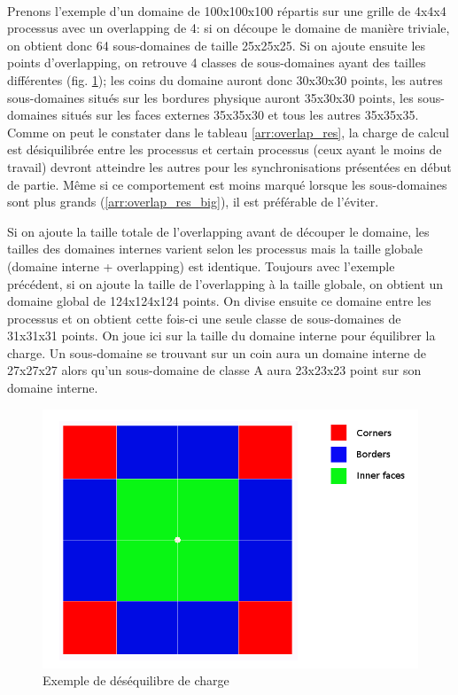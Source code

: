 \paragraph{}Prenons l'exemple d'un domaine de 100x100x100 répartis sur une grille de 4x4x4 processus avec un overlapping de 4: si on découpe le domaine de manière triviale, on obtient donc 64 sous-domaines de taille 25x25x25. Si on ajoute ensuite les points d'overlapping, on retrouve 4 classes de sous-domaines ayant des tailles différentes (fig. \ref{fig:domain_desequilibre}); les coins du domaine auront donc 30x30x30 points, les autres sous-domaines situés sur les bordures physique auront 35x30x30 points, les sous-domaines situés sur les faces externes 35x35x30 et tous les autres 35x35x35. Comme on peut le constater dans le tableau \ref{arr:overlap_res}, la charge de calcul est désiquilibrée entre les processus et certain processus (ceux ayant le moins de travail) devront atteindre les autres pour les synchronisations présentées en début de partie. Même si ce comportement est moins marqué lorsque les sous-domaines sont plus grands (\ref{arr:overlap_res_big}), il est préférable de l'éviter.
  
Si on ajoute la taille totale de l'overlapping avant de découper le domaine, les tailles des domaines internes varient selon les processus mais la taille globale (domaine interne + overlapping) est identique. Toujours avec l'exemple précédent, si on ajoute la taille de l'overlapping à la taille globale, on obtient un domaine global de 124x124x124 points. On divise ensuite ce domaine entre les processus et on obtient cette fois-ci une seule classe de sous-domaines de 31x31x31 points. On joue ici sur la taille du domaine interne pour équilibrer la charge. Un sous-domaine se trouvant sur un coin aura un domaine interne de 27x27x27 alors qu'un sous-domaine de classe A aura 23x23x23 point sur son domaine interne.


\begin{figure}[ht]
  \centering
  \includegraphics[scale=0.3]{figures/domain_dese.png}
  \caption{\label{fig:domain_desequilibre}Exemple de déséquilibre de charge}
\end{figure}


